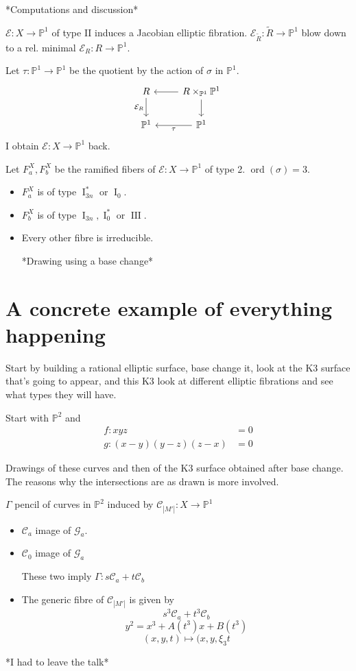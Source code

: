 *Computations and discussion*

$\mathcal{E}:X\to \mathbb{P}^1$ of type  II induces a Jacobian elliptic fibration. $\mathcal{E}_{\tilde{R}}:\tilde{R}\to \mathbb{P}^1$ blow down to a rel. minimal $\mathcal{E}_R:R\to \mathbb{P}^1$.

Let $\tau :\mathbb{P}^1\to \mathbb{P}^1$ be the quotient by the action of $\sigma$ in $\mathbb{P}^1$.
\[\begin{tikzcd}
	R\arrow[d,swap,"\mathcal{E}_R"]& R\times_{\mathbb{P}^1}\mathbb{P}^1\arrow[l]\arrow[d]\\
	\mathbb{P}^1&\mathbb{P}^1\arrow[l,"\tau "]
\end{tikzcd}\]
I obtain $\mathcal{E}:X\to \mathbb{P}^1$ back.

Let $F_a^X,F_b^X$ be the ramified fibers of $\mathcal{E}:X\to \mathbb{P}^1$ of type 2. $\operatorname{ord}(\sigma)=3$.
\begin{itemize}
\item $F^X_a$ is of type $\operatorname{I}^*_{3n}$ or $\operatorname{I}_{0}$.
\item $F^X_b$ is of type $\operatorname{I}_{3n},\operatorname{I}^*_{0}$ or $\operatorname{I I I}$.
\item Every other fibre is irreducible.

	*Drawing using a base change*
\end{itemize}

\section{A concrete example of everything happening}

Start by building a rational elliptic surface, base change it, look at the K3 surface that's going to appear, and this K3 look at different elliptic fibrations and see what types they will have.

Start with $\mathbb{P}^2$ and
\begin{align*}
	f:xyz&=0\\
	g:(x-y)(y-z)(z-x)&=0
\end{align*}

Drawings of these curves and then of the K3 surface obtained after base change. The reasons why the intersections are as drawn is more involved.

$\Gamma$ pencil of curves in $\mathbb{P}^2$ induced by $\mathcal{C}_{|M'|}:X\to \mathbb{P}^1$ 
\begin{itemize}
\item $\mathcal{C}_{a}$ image of $\mathcal{G}_{a}$.

\item $\mathcal{C}_{0}$ image of $\mathcal{G}_{a}$ 

	These two imply $\Gamma:s\mathcal{C}_{a}+t\mathcal{C}_{b}$ 

\item The generic fibre of $\mathcal{C}_{|M'|}$ is given by
	\[s^3\mathcal{C}_a+t^3\mathcal{C}_b\]
	\[y^2=x^3+A(t^3)x+B(t^3)\]
	\[(x,y,t)\mapsto (x,y,\xi_3t\]
\end{itemize}

*I had to leave the talk*

